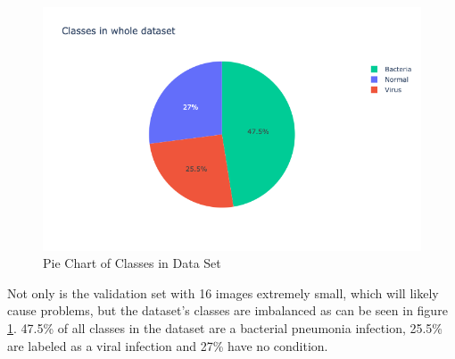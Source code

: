 \begin{figure}[h]
  \centering
  \includegraphics[width=\linewidth]{figures/pieChartClasses.png}
  \caption{Pie Chart of Classes in Data Set}
  \label{fig:data}
\end{figure}

Not only is the validation set with 16 images extremely small, which will likely cause problems, but the dataset’s classes are imbalanced as can be seen in figure \ref{fig:data}. 47.5\% of all classes in the dataset are a bacterial pneumonia infection, 25.5\% are labeled as a viral infection and 27\% have no condition. 